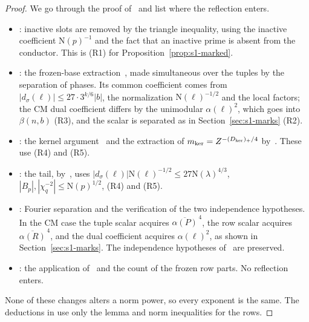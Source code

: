 \documentclass[11pt]{article}
\numberwithin{equation}{section}
\newcommand{\N}{\mathrm N}
\begin{document}
\begin{proof}
We go through the proof of~\cite[Lemma~14.3]{OAI78} and list where the reflection
enters.
\begin{itemize}
\item \cite[proof of Lemma~14.3]{OAI78}: inactive slots are removed by the triangle inequality, using the inactive coefficient
 $\N(p)^{-1}$ and the fact that an inactive prime is absent from the conductor. This is (R1) for
 Proposition~\ref{prop:s1-marked}.
\item \cite[proof of Lemma~14.3]{OAI78}: the frozen-base extraction~\cite[eq.~(5.32)]{OAI78}, made simultaneous over the
 tuples by the separation of phases. Its common coefficient comes from $|d_\sigma(\ell)|\le27\cdot3^{k/6}|b|$, the
 normalization $\N(\ell)^{-1/2}$ and the local factors; the CM dual coefficient differs by the unimodular
 $\alpha(\ell)^2$, which goes into $\beta(n,b)$ (R3), and the scalar is separated as in Section~\ref{sec:s1-marks}
 (R2).
\item \cite[proof of Lemma~14.3]{OAI78}: the kernel argument~\cite[eq.~(14.15)]{OAI78} and the extraction of
 $m_{\rm ker}=Z^{-(D_{\rm ker})_+/4}$ by~\cite[Lemma~5.3]{OAI78}. These use (R4) and (R5).
\item \cite[proof of Lemma~14.3]{OAI78}: the tail, by~\cite[Lemma~5.4]{OAI78}, uses $|d_\sigma(\ell)|\N(\ell)^{-1/2}\le
 27\N(\lambda)^{4/3}$, $|B_p|,|\chi_q^{-2}|\le\N(p)^{1/2}$, (R4) and (R5).
\item \cite[proof of Lemma~14.3]{OAI78}: Fourier separation and the verification of the two independence hypotheses. In the CM case the
 tuple scalar acquires $\overline{\alpha(P)}^{\,4}$, the row scalar acquires $\overline{\alpha(R)}^{\,4}$, and the dual
 coefficient acquires $\alpha(\ell)^2$, as shown in Section~\ref{sec:s1-marks}. The independence hypotheses
 of~\cite[Lemma~14.2]{OAI78} are preserved.
\item \cite[proof of Lemma~14.3]{OAI78}: the application of~\cite[Lemma~14.2]{OAI78} and the count of the frozen row parts. No
 reflection enters.
\end{itemize}
None of these changes alters a norm power, so every exponent is the same. The deductions in \cite[Section~14.4, \emph{Reflected block data}]{OAI78} use only the
lemma and norm inequalities for the rows.
\end{proof}
\end{document}
